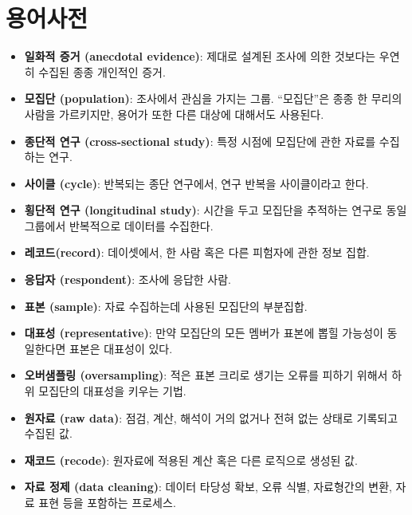 \section{용어사전}

\begin{itemize}

\item {\bf 일화적 증거 (anecdotal evidence)}: 
제대로 설계된 조사에 의한 것보다는 우연히 수집된 종종 개인적인 증거.

\item {\bf 모집단 (population)}: 조사에서 관심을 가지는 그룹. ``모집단''은 종종
한 무리의 사람을 가르키지만, 용어가 또한 다른 대상에 대해서도 사용된다. 

\item {\bf 종단적 연구 (cross-sectional study)}: 특정 시점에 모집단에 관한 자료를 수집하는 연구.

\item {\bf 사이클 (cycle)}: 반복되는 종단 연구에서, 연구 반복을 사이클이라고 한다.

\item {\bf 횡단적 연구 (longitudinal study)}: 
시간을 두고 모집단을 추적하는 연구로 동일 그룹에서 반복적으로 데이터를 수집한다.

\item {\bf 레코드(record)}: 데이셋에서, 한 사람 혹은 다른 피험자에 관한 정보 집합.

\item {\bf 응답자 (respondent)}: 조사에 응답한 사람.

\item {\bf 표본 (sample)}: 자료 수집하는데 사용된 모집단의 부분집합.

\item {\bf 대표성 (representative)}: 만약 모집단의 모든 멤버가 표본에 뽑힐 가능성이 동일한다면 표본은 대표성이 있다.

\item {\bf 오버샘플링 (oversampling)}: 적은 표본 크리로 생기는 오류를 피하기 위해서 하위 모집단의 대표성을 키우는 기법.

\item {\bf 원자료 (raw data)}: 점검, 계산, 해석이 거의 없거나 전혀 없는 상태로 기록되고 수집된 값.

\item {\bf 재코드 (recode)}: 원자료에 적용된 계산 혹은 다른 로직으로 생성된 값.

\item {\bf 자료 정제 (data cleaning)}: 데이터 타당성 확보, 오류 식별, 자료형간의 변환, 자료 표현 등을 포함하는 프로세스.
\end{itemize}

